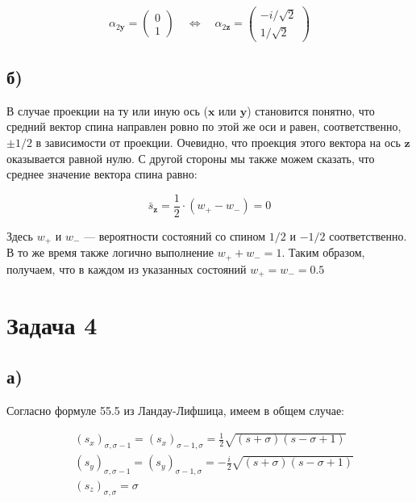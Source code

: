 \documentclass[a4paper, 12pt]{article}
\newcommand{\qlrq}
{\ensuremath{\quad \Leftrightarrow \quad}} %
\begin{document}
\begin{equation}
	\alpha_{2\mathbf{y}} = 
	\begin{pmatrix}
	0\\
	1
	\end{pmatrix}
	\qlrq \boxed{\alpha_{2\mathbf{z}} = 
	\begin{pmatrix}
	-i / \sqrt{2}\\
	1 / \sqrt{2}
	\end{pmatrix}}
\end{equation}

\subsection*{б)}

В случае проекции на ту или иную ось ($\mathbf{x}$ или $\mathbf{y}$) становится понятно, что средний вектор спина направлен ровно по этой же оси и равен, соответственно, $\pm 1/2$ в зависимости от проекции. Очевидно, что проекция этого вектора на ось $\mathbf{z}$ оказывается равной нулю. С другой стороны мы также можем сказать, что среднее значение вектора спина равно:

\begin{equation*}
	\bar{s}_{\mathbf{z}} = \frac{1}{2} \cdot (w_+ - w_-) = 0
\end{equation*}

Здесь $w_+$ и $w_-$ --- вероятности состояний со спином $1/2$ и $-1/2$ соответственно. В то же время также логично выполнение $w_+ + w_- = 1$. Таким образом, получаем, что в каждом из указанных состояний $\boxed{w_+ = w_- = 0.5}$ 

\section*{Задача 4}

\subsection*{а)}

Согласно формуле 55.5 из Ландау-Лифшица, имеем в общем случае:

\begin{align*}
	&(s_x)_{\sigma,\sigma-1} = (s_x)_{\sigma-1,\sigma} = \frac{1}{2} \sqrt{(s + \sigma)(s - \sigma + 1)}\\
	&(s_y)_{\sigma, \sigma-1} = (s_y)_{\sigma - 1, \sigma} = -\frac{i}{2}\sqrt{(s + \sigma) (s - \sigma + 1)}\\
	&(s_z)_{\sigma, \sigma} = \sigma
\end{align*}
\end{document}
